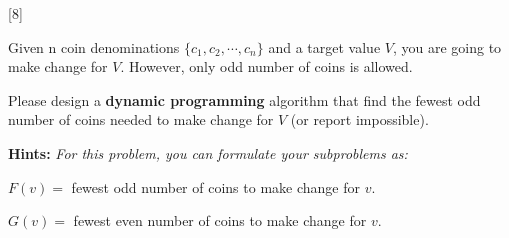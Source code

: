 [8]

Given n coin denominations $\{c_1,c_2,\cdots,c_n\}$ and a target value $V$, you are going to make change for $V$. However, only odd number of coins is allowed.

Please design a \textbf{dynamic programming} algorithm that find the fewest odd number of coins needed to make change for $V$ (or report impossible).

\textbf{Hints:} \textit{For this problem, you can formulate your subproblems as:}
\begin{center}
    $F(v)=$ fewest odd number of coins to make change for $v$.
    
    $G(v)=$ fewest even number of coins to make change for $v$.
\end{center}

\begin{solution}
    \vspace{6in}
    
\end{solution}

